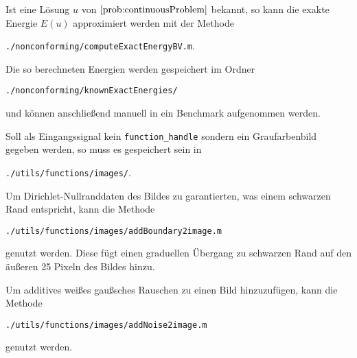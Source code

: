 Ist eine Lösung $u$ von $\Cref{prob:continuousProblem}$ bekannt, so kann die
exakte Energie $E(u)$ approximiert werden mit der Methode
\begin{center}
  \texttt{./nonconforming/computeExactEnergyBV.m}.
\end{center}
Die so berechneten Energien werden gespeichert im Ordner
\begin{center}
  \texttt{./nonconforming/knownExactEnergies/}
\end{center}
und können anschließend manuell in ein Benchmark aufgenommen werden.

Soll als Eingangssignal kein \texttt{function\_handle} sondern ein
Graufarbenbild gegeben werden, so muss es gespeichert sein in 
\begin{center}
  \texttt{./utils/functions/images/}.
\end{center}
Um Dirichlet-Nullranddaten des Bildes zu garantierten, was einem schwarzen Rand
entspricht, kann die Methode 
\begin{center}
  \texttt{./utils/functions/images/addBoundary2image.m}
\end{center}
genutzt werden. Diese fügt einen graduellen Übergang zu schwarzen Rand auf den 
äußeren 25 Pixeln des Bildes hinzu.

Um additives weißes gaußsches Rauschen zu einen Bild hinzuzufügen, kann die
Methode
\begin{center}
  \texttt{./utils/functions/images/addNoise2image.m}
\end{center}
genutzt werden. 


